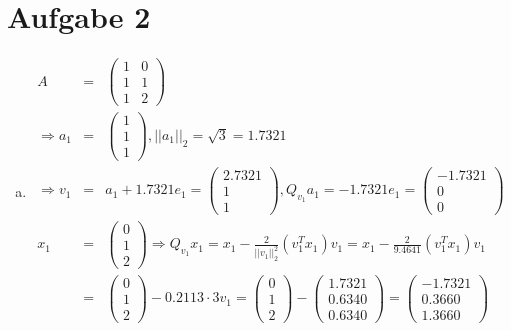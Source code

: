 \documentclass[11pt]{article} %
\begin{document}
\section*{Aufgabe 2}

\begin{enumerate}[a)]

\item

\begin{eqnarray*}
A &=& \begin{pmatrix} 1 & 0 \\ 1 & 1 \\ 1 & 2 \end{pmatrix} \\
\Rightarrow a_1 &=& \begin{pmatrix} 1 \\ 1 \\ 1 \end{pmatrix}, ||a_1||_2 = \sqrt{3} = 1.7321 \\
\Rightarrow v_1 &=& a_1 + 1.7321e_1 = \begin{pmatrix}2.7321 \\ 1 \\ 1 \end{pmatrix}, Q_{v_1}a_1 = -1.7321e_1 = \begin{pmatrix} -1.7321 \\ 0 \\0 \end{pmatrix}\\
 x_1 &=& \begin{pmatrix} 0 \\ 1\\ 2 \end{pmatrix} \Rightarrow Q_{v_1}x_1 = x_1  - \frac 2 {||v_1||_2^2} (v_1^T x_1)v_1 = x_1 - \frac 2 {9.4641}(v_1^Tx_1)v_1 \\
&=& \begin{pmatrix} 0\\ 1\\ 2 \end{pmatrix} - 0.2113 \cdot 3 v_1 =\begin{pmatrix} 0\\ 1\\ 2 \end{pmatrix}- \begin{pmatrix}  1.7321 \\   0.6340 \\   0.6340 \end{pmatrix} = \begin{pmatrix} -1.7321\\0.3660 \\ 1.3660 \end{pmatrix} \\

\end{eqnarray*}
\end{enumerate}
\end{document}
